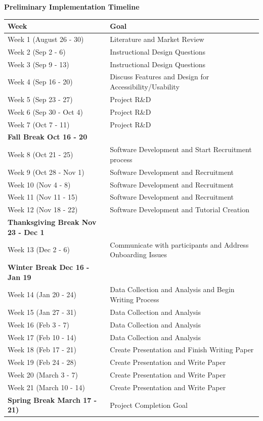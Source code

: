 \documentclass[manuscript,screen,review]{acmart}
\begin{document}
\textbf{Preliminary Implementation Timeline}

\begin{table}[h]
\begin{tabular}{@{}ll@{}}
\toprule
\textbf{Week}                 & \textbf{Goal}                               \\ \midrule
Week 1 (August 26 - 30) & Literature and Market Review      \\
Week 2 (Sep 2 - 6)   & Instructional Design Questions    \\
Week 3 (Sep 9 - 13)  & Instructional Design Questions    \\
Week 4 (Sep 16 - 20) & Discuss Features and Design for Accessibility/Usability \\
Week 5 (Sep 23 - 27) & Project R\&D                      \\
Week 6 (Sep 30 - Oct 4) & Project R\&D                     \\
Week 7 (Oct 7 - 11)  & Project R\&D                      \\ \midrule
\textbf{Fall Break Oct 16 - 20} &                                \\ \midrule
Week 8 (Oct 21 - 25) & Software Development and Start Recruitment process \\
Week 9 (Oct 28 - Nov 1) & Software Development and Recruitment \\
Week 10 (Nov 4 - 8)  & Software Development and Recruitment \\
Week 11 (Nov 11 - 15) & Software Development and Recruitment \\
Week 12 (Nov 18 - 22) & Software Development and Tutorial Creation \\ \midrule
\textbf{Thanksgiving Break Nov 23 - Dec 1} &                   \\ \midrule
Week 13 (Dec 2 - 6)  & Communicate with participants and Address Onboarding Issues \\ \midrule
\textbf{Winter Break Dec 16 - Jan 19} &                           \\ \midrule
Week 14 (Jan 20 - 24) & Data Collection and Analysis and Begin Writing Process\\
Week 15 (Jan 27 - 31) & Data Collection and Analysis       \\
Week 16 (Feb 3 - 7)   & Data Collection and Analysis       \\
Week 17 (Feb 10 - 14) & Data Collection and Analysis       \\ \midrule
Week 18 (Feb 17 - 21) & Create Presentation and Finish Writing Paper \\
Week 19 (Feb 24 - 28) & Create Presentation and Write Paper \\
Week 20 (March 3 - 7) & Create Presentation and Write Paper \\
Week 21 (March 10 - 14) & Create Presentation and Write Paper \\ \midrule
\textbf{Spring Break March 17 - 21)} & Project Completion Goal  \\ \midrule
\end{tabular}
\end{table}
\end{document}
